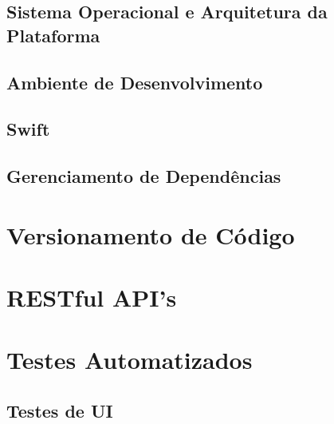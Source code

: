 \subsection{Sistema Operacional e Arquitetura da Plataforma}

\subsection{Ambiente de Desenvolvimento}

\subsection{Swift}

\subsection{Gerenciamento de Dependências}

\section{Versionamento de Código}

\section{RESTful API's}

\section{Testes Automatizados}
\subsection{Testes de UI}
